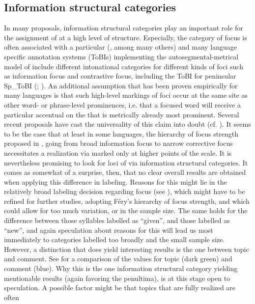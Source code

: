 \documentclass[output=paper]{LSP/langsci}
\begin{document}

\subsection{Information structural categories}
In many proposals, information structural categories play an important role for the assignment of  at a high level of  structure. Especially, the category of focus is often associated with a particular  (\citealt{Buering2012}, among many others) and many language specific annotation systems (ToBIs) implementing the autosegmental-metrical model of  \citep{Pierrehumbert1980} include different intonational categories for different kinds of foci such as information focus and contrastive focus, including the ToBI for peninsular  Sp\_ToBI (\citealt{Beckman.2002}; \citealt{EstebasVilaplanaPrieto.2008}). An additional assumption that has been proven empirically for many languages is that such high-level  markings of foci occur at the same site as other word- or phrase-level prominences, i.e. that a focused word will receive a particular accentual  on the  that is metrically already most prominent. Several recent proposals have cast the universality of this claim into doubt (cf. \citealt{Kuegler2012,Fery2013}). It seems to be the case that at least in some languages, the hierarchy of focus strength proposed in \citet[688--690]{Fery2013}, going from broad information focus to narrow corrective focus necessitates a realization via marked  only at higher points of the scale. It is nevertheless promising to look for loci of  via information structural categories. It comes as somewhat of a surprise, then, that no clear overall results are obtained when applying this difference in labeling. Reasons for this might lie in the relatively broad labeling decision regarding focus (see ), which might have to be refined for further studies, adopting Féry’s hierarchy of focus strength, and which could allow for too much variation, or in the sample size. The same holds for the difference between those syllables labelled as “given”, and those labelled as “new”, and again speculation about reasons for this will lead us most immediately to categories labelled too broadly and the small sample size. However, a distinction that does yield interesting results is the one between topic and comment. See  for a comparison of the values for topic (dark green) and comment (blue). Why this is the one information structural category yielding mentionable results (again favoring the penultima), is at this stage open to speculation. A possible factor might be that topics that are fully realized are often 
\end{document}
